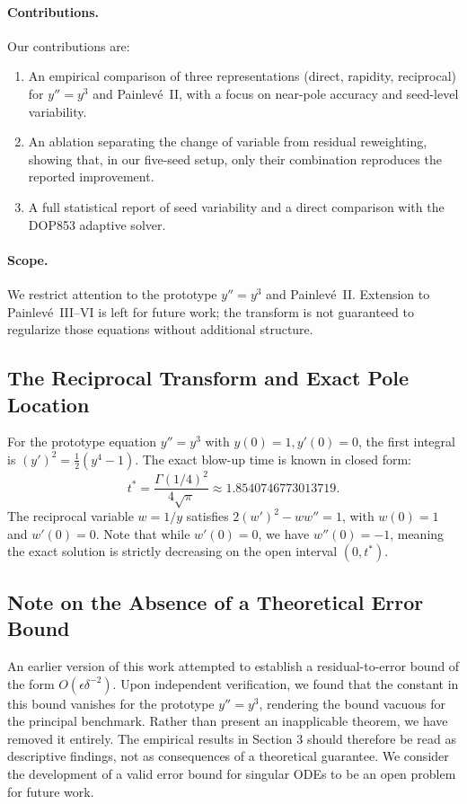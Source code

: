 \documentclass[a4paper, 10pt]{article}
\theoremstyle{definition}
\begin{document}
\paragraph{Contributions.}
Our contributions are:
\begin{enumerate}
\item An empirical comparison of three representations (direct, rapidity, reciprocal) for \(y''=y^3\) and Painlev\'e~II, with a focus on near-pole accuracy and seed-level variability.
\item An ablation separating the change of variable from residual reweighting, showing that, in our five-seed setup, only their combination reproduces the reported improvement.
\item A full statistical report of seed variability and a direct comparison with the DOP853 adaptive solver.
\end{enumerate}

\paragraph{Scope.}
We restrict attention to the prototype \(y''=y^3\) and Painlev\'e~II. Extension to Painlev\'e~III--VI is left for future work; the transform is not guaranteed to regularize those equations without additional structure.

\subsection{The Reciprocal Transform and Exact Pole Location}

For the prototype equation \(y''=y^3\) with \(y(0)=1, y'(0)=0\), the first integral is \((y')^2 = \frac{1}{2}(y^4 - 1)\). The exact blow-up time is known in closed form:
\begin{equation}
t^* = \frac{\Gamma(1/4)^2}{4\sqrt{\pi}} \approx 1.8540746773013719.
\end{equation}
The reciprocal variable \(w = 1/y\) satisfies \(2(w')^2 - ww'' = 1\), with \(w(0)=1\) and \(w'(0)=0\). Note that while \(w'(0)=0\), we have \(w''(0)=-1\), meaning the exact solution is strictly decreasing on the open interval \((0, t^*)\).

\subsection{Note on the Absence of a Theoretical Error Bound}

An earlier version of this work attempted to establish a residual-to-error bound of the form \(O(\epsilon \delta^{-2})\). Upon independent verification, we found that the constant in this bound vanishes for the prototype \(y''=y^3\), rendering the bound vacuous for the principal benchmark. Rather than present an inapplicable theorem, we have removed it entirely. The empirical results in Section 3 should therefore be read as descriptive findings, not as consequences of a theoretical guarantee. We consider the development of a valid error bound for singular ODEs to be an open problem for future work.
\end{document}
